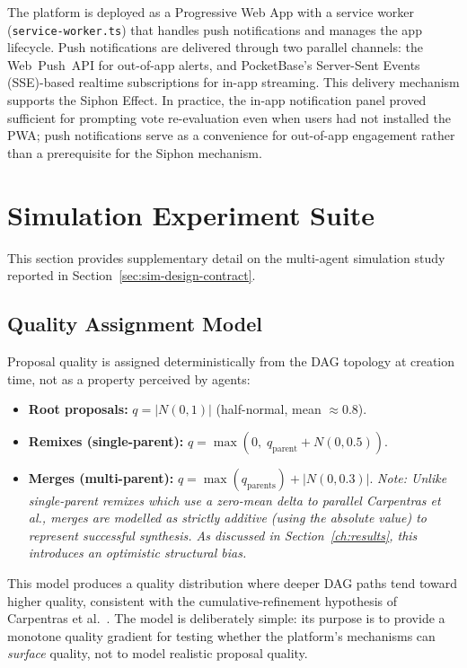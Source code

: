 \documentclass[a4paper, 12pt, twoside]{iviathesis}
\begin{document}
The platform is deployed as a Progressive Web App with a service worker (\texttt{service-worker.ts}) that handles push notifications and manages the app lifecycle. Push notifications are delivered through two parallel channels: the Web~Push~API for out-of-app alerts, and PocketBase's Server-Sent Events (SSE)-based realtime subscriptions for in-app streaming. This delivery mechanism supports the Siphon Effect. In practice, the in-app notification panel proved sufficient for prompting vote re-evaluation even when users had not installed the PWA; push notifications serve as a convenience for out-of-app engagement rather than a prerequisite for the Siphon mechanism.

\section{Simulation Experiment Suite}
\label{sec:sim-appendix}

This section provides supplementary detail on the multi-agent simulation study reported in Section~\ref{sec:sim-design-contract}.

\subsection{Quality Assignment Model}

Proposal quality is assigned deterministically from the DAG topology at creation time, not as a property perceived by agents:
\begin{itemize}
    \item \textbf{Root proposals:} $q = |N(0, 1)|$ (half-normal, mean $\approx 0.8$).
    \item \textbf{Remixes (single-parent):} $q = \max(0,\; q_{\text{parent}} + N(0, 0.5))$.
    \item \textbf{Merges (multi-parent):} $q = \max(q_{\text{parents}}) + |N(0, 0.3)|$. \textit{Note: Unlike single-parent remixes which use a zero-mean delta to parallel Carpentras et al., merges are modelled as strictly additive (using the absolute value) to represent successful synthesis. As discussed in Section~\ref{ch:results}, this introduces an optimistic structural bias.}
\end{itemize}

\noindent This model produces a quality distribution where deeper DAG paths tend toward higher quality, consistent with the cumulative-refinement hypothesis of Carpentras et al.\ \cite{carpentras_wisdom_2025}. The model is deliberately simple: its purpose is to provide a monotone quality gradient for testing whether the platform's mechanisms can \textit{surface} quality, not to model realistic proposal quality.
\end{document}
